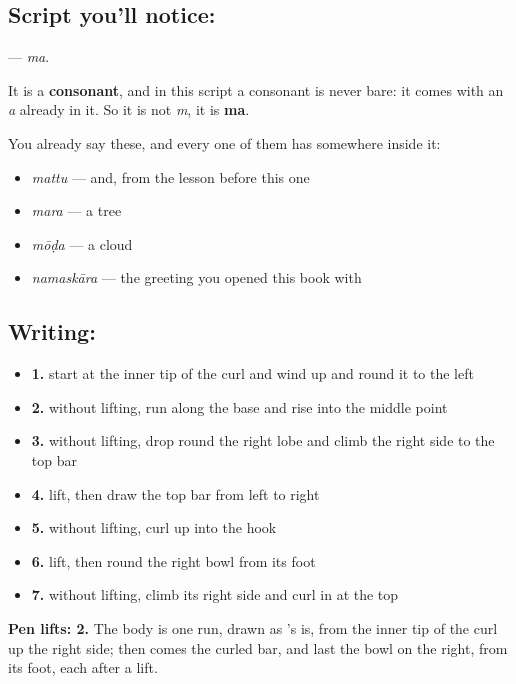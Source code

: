 \subsection*{Script you'll notice: }
\textbf{} — \emph{ma}.

It is a \textbf{consonant}, and in this script a consonant is never bare: it comes with an \emph{a} already in it. So it is not \emph{m}, it is \textbf{ma}.

You already say these, and every one of them has  somewhere inside it:

\begin{itemize}
\raggedright
  \item \textbf{} \emph{mattu} — and, from the lesson before this one
  \item \textbf{} \emph{mara} — a tree
  \item \textbf{} \emph{mōḍa} — a cloud
  \item \textbf{} \emph{namaskāra} — the greeting you opened this book with
\end{itemize}

\subsection*{Writing: }

\begin{itemize}
\raggedright
  \item \textbf{1.} start at the inner tip of the curl and wind up and round it to the left
  \item \textbf{2.} without lifting, run along the base and rise into the middle point
  \item \textbf{3.} without lifting, drop round the right lobe and climb the right side to the top bar
  \item \textbf{4.} lift, then draw the top bar from left to right
  \item \textbf{5.} without lifting, curl up into the hook
  \item \textbf{6.} lift, then round the right bowl from its foot
  \item \textbf{7.} without lifting, climb its right side and curl in at the top
\end{itemize}

\textbf{Pen lifts: 2.} The body is one run, drawn as 's is, from the inner tip of the curl up the right side; then comes the curled bar, and last the bowl on the right, from its foot, each after a lift.

